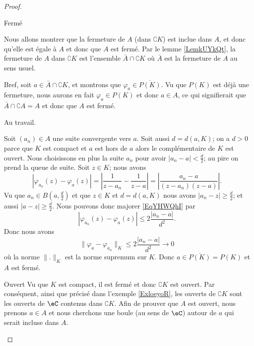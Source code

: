 \begin{proof}
\begin{subproof}
    \item[Fermé] 
            
        Nous allons montrer que la fermeture de \( A\) (dans \( \complement K\)) est inclue dans \( A\), et donc qu'elle est égale à \( A\) et donc que \( A\) est fermé. Par le lemme \ref{LemkUYkQt}, la fermeture de \( A\) dans \( \complement K\) est l'ensemble \( \bar A\cap\complement K\) où \( \bar A\) est la fermeture de \( A\) au sens usuel.

        Bref, soit \( a\in \bar A\cap\complement K\), et montrons que \( \varphi_a\in \overline{ P(K) }\). Vu que \( P(K)\) est déjà une fermeture, nous aurons en fait \( \varphi_a\in P(K)\) et donc \( a\in A\), ce qui signifierait que \( \bar A\cap\complement A=A\) et donc que \( A\) est fermé.

        Au travail.

        Soit \( (a_n)\in A\) une suite convergente vers \( a\). Soit aussi \( d=d(a,K)\); on a \( d>0\) parce que \( K\) est compact et \( a\) est hors de \( a\) alors le complémentaire de \( K\) est ouvert. Nous choisissons en plus la suite \( a_n\) pour avoir \( | a_n-a |<\frac{ d }{2}\); au pire on prend la queue de suite. Soit \( z\in K\); nous avons
        \begin{equation}    \label{EqYHWQhI}
            | \varphi_{a_n}(z)-\varphi_a(z) |=\left| \frac{1}{ z-a_n }-\frac{1}{ z-a } \right| =  \left| \frac{ a_n-a }{ (z-a_n)(z-a) } \right|.
        \end{equation}
        Vu que \( a_n\in B(a,\frac{ d }{2})\) et que \( z\in K\) et \( d=d(a,K)\) nous avons \( | a_n-z |\geq \frac{ d }{2}\); et aussi \( | a-z |\geq \frac{ d }{2}\). Nous pouvons donc majorer \eqref{EqYHWQhI} par
        \begin{equation}
            | \varphi_{a_n}(z)-\varphi_a(z) |\leq 2\frac{ | a_n-a | }{ d^2 }.
        \end{equation}
        Donc nous avons
        \begin{equation}
            \| \varphi_a-\varphi_{a_n} \|_K\leq 2\frac{ | a_n-a | }{ d^2 }\to 0
        \end{equation}
        où la norme \( \| . \|_K\) est la norme supremum sur \( K\). Donc \( a\in \overline{ P(K) }=P(K)\) et \( A\) est fermé.

    \item[Ouvert] Vu que \( K\) est compact, il est fermé et donc \( \complement K\) est ouvert. Par conséquent, ainsi que précisé dans l'exemple \ref{ExloeyoR}, les ouverts de \( \complement K\) sont les ouverts de \( \eC\) contenus dans \( \complement K\). Afin de prouver que \( A\) est ouvert, nous prenons  \( a\in A\) et nous cherchons une boule (au sens de \( \eC\)) autour de \( a\) qui serait incluse dans \( A\).


\end{subproof}
\end{proof}
